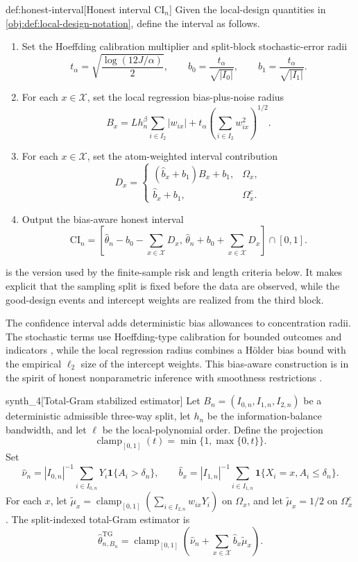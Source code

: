 \documentclass[11pt]{article}
\begin{document}
\begin{algorithmv}{def:honest-interval}[Honest interval \(\mathrm{CI}_n\)]
Given the local-design quantities in \cref{obj:def:local-design-notation}, define the interval as follows.
\begin{enumerate}
\item Set the Hoeffding calibration multiplier and split-block stochastic-error radii
\[
t_\alpha=\sqrt{\frac{\log(12J/\alpha)}{2}},
\qquad
b_0=\frac{t_\alpha}{\sqrt{|I_0|}},
\qquad
b_1=\frac{t_\alpha}{\sqrt{|I_1|}}.
\]
\item For each \(x\in\mathcal X\), set the local regression bias-plus-noise radius
\[
B_x
=
Lh_n^\beta\sum_{i\in I_2}|w_{ix}|
+
t_\alpha\left(\sum_{i\in I_2}w_{ix}^2\right)^{1/2}.
\]
\item For each \(x\in\mathcal X\), set the atom-weighted interval contribution
\[
D_x
=
\begin{cases}
(\widehat b_x+b_1)B_x+b_1,& \Omega_x,\\
\widehat b_x+b_1,& \Omega_x^{c}.
\end{cases}
\]
\item Output the bias-aware honest interval
\[
\mathrm{CI}_n
=
\left[
\widehat\theta_n-b_0-\sum_{x\in\mathcal X}D_x,\,
\widehat\theta_n+b_0+\sum_{x\in\mathcal X}D_x
\right]\cap[0,1].
\]
\end{enumerate}
\end{algorithmv}

 is the version used by the finite-sample risk and length criteria below. It makes explicit that the sampling split is fixed before the data are observed, while the good-design events and intercept weights are realized from the third block.

The confidence interval adds deterministic bias allowances to concentration radii. The stochastic terms use Hoeffding-type calibration for bounded outcomes and indicators \citep{Hoeffding1963}, while the local regression radius combines a Hölder bias bound with the empirical \(\ell_2\) size of the intercept weights. This bias-aware construction is in the spirit of honest nonparametric inference with smoothness restrictions \citep{ArmstrongKolesar2018OptimalInference,ArmstrongKolesar2020}.

\begin{definitionv}{synth_4}[Total-Gram stabilized estimator]
Let \(B_n=(I_{0,n},I_{1,n},I_{2,n})\) be a deterministic admissible three-way split, let \(h_n\) be the information-balance bandwidth, and let \(\ell\) be the local-polynomial order. Define the projection
\[
  \operatorname{clamp}_{[0,1]}(t)=\min\{1,\max\{0,t\}\}.
\]
Set
\[
  \widehat\nu_n=|I_{0,n}|^{-1}\sum_{i\in I_{0,n}}Y_i\mathbf 1\{A_i>\delta_n\},\qquad
  \widehat b_x=|I_{1,n}|^{-1}\sum_{i\in I_{1,n}}\mathbf 1\{X_i=x,A_i\le\delta_n\}.
\]
For each \(x\), let \(\widetilde\mu_x=\operatorname{clamp}_{[0,1]}(\sum_{i\in I_{2,n}}w_{ix}Y_i)\) on \(\Omega_x\), and let \(\widetilde\mu_x=1/2\) on \(\Omega_x^c\). The split-indexed total-Gram estimator is
\[
  \widehat\theta_{n,B_n}^{\mathrm{TG}}
  =\operatorname{clamp}_{[0,1]}\!\left(\widehat\nu_n+\sum_{x\in\mathcal X}\widehat b_x\widetilde\mu_x\right).
\]
\end{definitionv}
\end{document}
